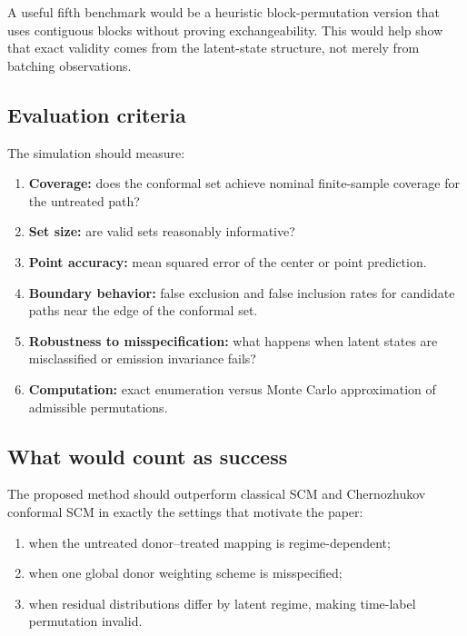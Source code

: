 \documentclass[11pt]{article}
\begin{document}
A useful fifth benchmark would be a heuristic block-permutation version that uses contiguous blocks without proving exchangeability. This would help show that exact validity comes from the latent-state structure, not merely from batching observations.

\subsection{Evaluation criteria}

The simulation should measure:

\begin{enumerate}[label=(\roman*)]
    \item \textbf{Coverage:} does the conformal set achieve nominal finite-sample coverage for the untreated path?
    \item \textbf{Set size:} are valid sets reasonably informative?
    \item \textbf{Point accuracy:} mean squared error of the center or point prediction.
    \item \textbf{Boundary behavior:} false exclusion and false inclusion rates for candidate paths near the edge of the conformal set.
    \item \textbf{Robustness to misspecification:} what happens when latent states are misclassified or emission invariance fails?
    \item \textbf{Computation:} exact enumeration versus Monte Carlo approximation of admissible permutations.
\end{enumerate}

\subsection{What would count as success}

The proposed method should outperform classical SCM and Chernozhukov conformal SCM in exactly the settings that motivate the paper:

\begin{enumerate}[label=(\alph*)]
    \item when the untreated donor--treated mapping is regime-dependent;
    \item when one global donor weighting scheme is misspecified;
    \item when residual distributions differ by latent regime, making time-label permutation invalid.
\end{enumerate}
\end{document}
